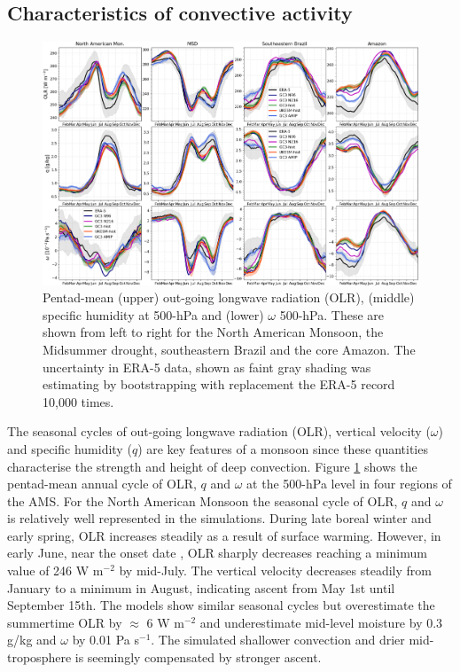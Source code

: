 \subsection{Characteristics of convective activity}

\begin{figure}[t!]
\centering
 \includegraphics[width=\linewidth]{figures/fig9b.png}
\caption{Pentad-mean (upper) out-going longwave radiation (OLR), (middle) specific humidity at 500-hPa and (lower) $\omega$ 500-hPa. These are shown from left to right for the North American Monsoon, the Midsummer drought, southeastern Brazil and the core Amazon. The uncertainty in ERA-5 data, shown as faint gray shading was estimating by bootstrapping with replacement the ERA-5 record 10,000 times. }
\label{fig:9}
\end{figure}


The seasonal cycles of out-going longwave radiation (OLR), vertical velocity ($\omega$) and specific humidity ($q$) are key features of a monsoon since these quantities characterise the strength and height of deep convection.
Figure \ref{fig:9} shows the pentad-mean annual cycle of OLR, $q$ and $\omega$ at the 500-hPa level in four regions of the AMS.
For the North American Monsoon the seasonal cycle of OLR, $q$ and $\omega$ is relatively well represented in the simulations.
During late boreal winter and early spring, OLR increases steadily as a result of surface warming.
However, in early June, near the onset date \citep{douglas1993,geil2013}, OLR sharply decreases reaching a minimum value of 246 W m$^{-2}$ by mid-July.
The vertical velocity decreases steadily from January to a minimum in August, indicating ascent from May 1st until September 15th.
 The models show similar seasonal cycles but overestimate the summertime OLR by $\approx$ 6 W m$^{-2}$ and underestimate mid-level moisture by 0.3 g/kg and $\omega$ by 0.01 Pa s$^{-1}$. 
The simulated shallower convection and drier mid-troposphere is seemingly compensated by stronger ascent.


